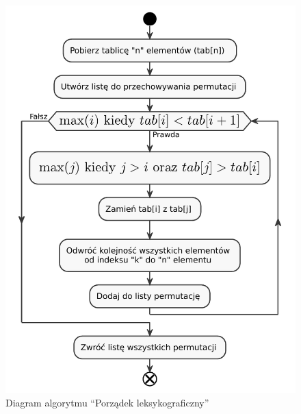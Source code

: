 \begin{figure}[H]
    \centering
    \includegraphics[scale=0.7]{chapters/chapter4/gen_perm.pdf}
    \caption{Diagram algorytmu ``Porządek leksykograficzny''}
    \label{gen_perm}
\end{figure}
